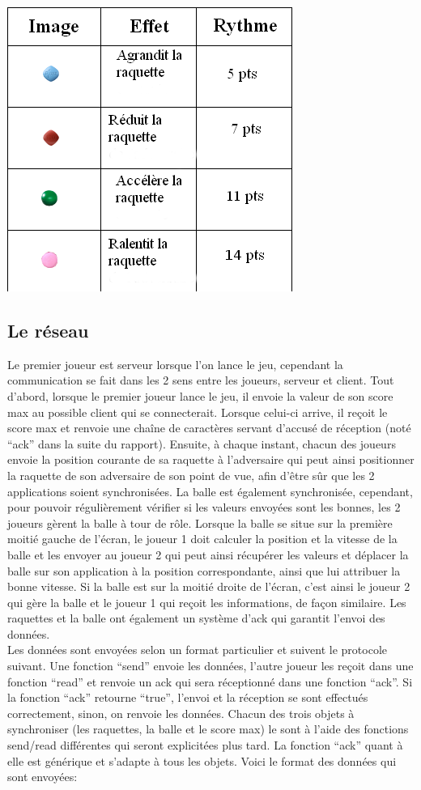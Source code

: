 \includegraphics[scale=0.5]{./images/pilules.png}


\subsection{Le réseau}

Le premier joueur est serveur lorsque l'on lance le jeu, cependant la communication se fait dans 
les 2 sens entre les joueurs, serveur et client. Tout d'abord, lorsque le premier joueur lance le jeu, il 
envoie la valeur de son score max au possible client qui se connecterait. Lorsque celui-ci arrive, il 
reçoit le score max et renvoie une chaîne de caractères servant d'accusé de réception (noté ``ack'' dans 
la suite du rapport).
Ensuite, à chaque instant, chacun des joueurs envoie 
la position courante de sa raquette à l'adversaire qui peut ainsi positionner la raquette de son 
adversaire de son point de vue, afin d'être sûr que les 2 applications soient synchronisées. La balle 
est également synchronisée, cependant, pour pouvoir régulièrement vérifier si les valeurs envoyées 
sont les bonnes, les 2 joueurs gèrent la balle à tour de rôle. Lorsque la balle se situe sur la 
première moitié gauche de l'écran, le joueur 1 doit calculer la position et la vitesse de la balle et les envoyer 
au joueur 2 qui peut ainsi récupérer les valeurs et déplacer la balle sur son application à la 
position correspondante, ainsi que lui attribuer la bonne vitesse. Si la balle est sur la moitié droite de l'écran,
c'est ainsi le joueur 
2 qui gère la balle et le joueur 1 qui reçoit les informations, de façon similaire. Les raquettes et la balle 
ont également un système d'ack qui garantit l'envoi des données.
\\
Les données sont envoyées selon un format particulier et suivent le protocole suivant. Une fonction ``send'' 
envoie les données, l'autre joueur les reçoit dans une fonction ``read'' et renvoie un ack qui sera réceptionné 
dans une fonction ``ack''. Si la fonction ``ack'' retourne ``true'', l'envoi et la réception se sont effectués 
correctement, sinon, on renvoie les données. Chacun des trois objets à synchroniser (les raquettes, la balle et 
le score max) le sont à l'aide des fonctions send/read différentes qui seront explicitées plus tard. La fonction ``ack'' 
quant à elle est générique et s'adapte à tous les objets. Voici le format des données qui sont envoyées:

